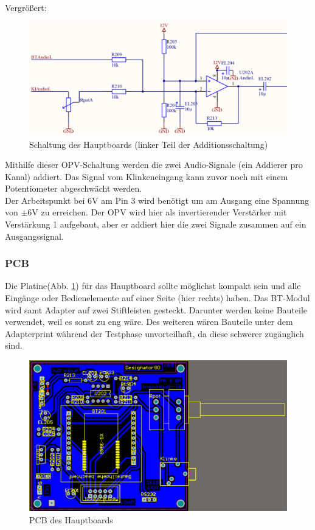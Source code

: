 Vergrößert:
\begin{figure} [H]
	\centering
	\includegraphics[width=1\textwidth]{img/BTModul/hauptboard_sch2_zoom.png}
	\caption{Schaltung des Hauptboards (linker Teil der Additionsschaltung)}
\end{figure}
Mithilfe dieser OPV-Schaltung werden die zwei Audio-Signale (ein Addierer pro Kanal) addiert. Das Signal vom Klinkeneingang kann zuvor noch mit einem Potentiometer abgeschwächt werden.\\
Der Arbeitspunkt bei 6V am Pin 3 wird benötigt um am Ausgang eine Spannung von $\pm$6V zu erreichen. Der OPV wird hier als invertierender Verstärker mit Verstärkung 1 aufgebaut, aber er addiert hier die zwei Signale zusammen auf ein Ausgangssignal.

\subsubsection{PCB} \label{subsec:4.1.9.3}
Die Platine(Abb. \ref {fig:4.1.9.3.1}) für das Hauptboard sollte möglichst kompakt sein und alle Eingänge oder Bedienelemente auf einer Seite (hier rechts) haben. Das BT-Modul wird samt Adapter auf zwei Stiftleisten gesteckt. Darunter werden keine Bauteile verwendet, weil es sonst zu eng wäre. Des weiteren wären Bauteile unter dem Adapterprint während der Testphase unvorteilhaft, da diese schwerer zugänglich sind.
\begin{figure} [H]
	\centering
	\includegraphics[width=1\textwidth]{img/BTModul/hauptboard_pcb.png}
	\caption{PCB des Hauptboards}\label {fig:4.1.9.3.1}
\end{figure}
\newpage


